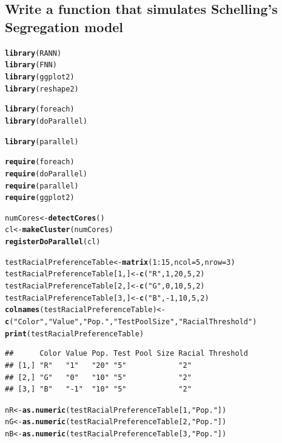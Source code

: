 \documentclass{article}\usepackage[]{graphicx}\usepackage[]{color}
\makeatletter
\newcommand{\hlnum}[1]{\textcolor[rgb]{0.686,0.059,0.569}{#1}}%
\newcommand{\hlstr}[1]{\textcolor[rgb]{0.192,0.494,0.8}{#1}}%
\newcommand{\hlopt}[1]{\textcolor[rgb]{0,0,0}{#1}}%
\newcommand{\hlstd}[1]{\textcolor[rgb]{0.345,0.345,0.345}{#1}}%
\newcommand{\hlkwb}[1]{\textcolor[rgb]{0.69,0.353,0.396}{#1}}%
\newcommand{\hlkwc}[1]{\textcolor[rgb]{0.333,0.667,0.333}{#1}}%
\newcommand{\hlkwd}[1]{\textcolor[rgb]{0.737,0.353,0.396}{\textbf{#1}}}%
\newenvironment{kframe}{%
 \def\at@end@of@kframe{}%
 \ifinner\ifhmode%
  \def\at@end@of@kframe{\end{minipage}}%
  \begin{minipage}{\columnwidth}%
 \fi\fi%
 \def\FrameCommand##1{\hskip\@totalleftmargin \hskip-\fboxsep
 \colorbox{shadecolor}{##1}\hskip-\fboxsep
     \hskip-\linewidth \hskip-\@totalleftmargin \hskip\columnwidth}%
 \MakeFramed {\advance\hsize-\width
   \@totalleftmargin\z@ \linewidth\hsize
   \@setminipage}}%
 {\par\unskip\endMakeFramed%
 \at@end@of@kframe}
\newenvironment{knitrout}{}{} %
\makeatother
\begin{document}
\subsection{Write a function that simulates Schelling's Segregation model}
\begin{knitrout}
\color{fgcolor}\begin{kframe}
\begin{alltt}
\hlkwd{library}\hlstd{(RANN)}
\hlkwd{library}\hlstd{(FNN)}
\hlkwd{library}\hlstd{(ggplot2)}
\hlkwd{library}\hlstd{(reshape2)}

\hlkwd{library}\hlstd{(foreach)}
\hlkwd{library}\hlstd{(doParallel)}
\end{alltt}


{\ttfamily\noindent\itshape\color{messagecolor}{\#\# Loading required package: iterators\\\#\# Loading required package: parallel}}\begin{alltt}
\hlkwd{library}\hlstd{(parallel)}

\hlkwd{require}\hlstd{(foreach)}
\hlkwd{require}\hlstd{(doParallel)}
\hlkwd{require}\hlstd{(parallel)}
\hlkwd{require}\hlstd{(ggplot2)}

\hlstd{numCores} \hlkwb{<-} \hlkwd{detectCores}\hlstd{()}
\hlstd{cl} \hlkwb{<-} \hlkwd{makeCluster}\hlstd{(numCores)}
\hlkwd{registerDoParallel}\hlstd{(cl)}

\hlstd{testRacialPreferenceTable} \hlkwb{<-} \hlkwd{matrix}\hlstd{(}\hlnum{1}\hlopt{:}\hlnum{15}\hlstd{,} \hlkwc{ncol} \hlstd{=} \hlnum{5}\hlstd{,} \hlkwc{nrow} \hlstd{=} \hlnum{3}\hlstd{)}
\hlstd{testRacialPreferenceTable[}\hlnum{1}\hlstd{,]} \hlkwb{<-} \hlkwd{c}\hlstd{(}\hlstr{"R"}\hlstd{,}\hlnum{1}\hlstd{,} \hlnum{20}\hlstd{,} \hlnum{5}\hlstd{,} \hlnum{2}\hlstd{)}
\hlstd{testRacialPreferenceTable[}\hlnum{2}\hlstd{,]} \hlkwb{<-} \hlkwd{c}\hlstd{(}\hlstr{"G"}\hlstd{,} \hlnum{0}\hlstd{,} \hlnum{10}\hlstd{,} \hlnum{5}\hlstd{,} \hlnum{2}\hlstd{)}
\hlstd{testRacialPreferenceTable[}\hlnum{3}\hlstd{,]} \hlkwb{<-} \hlkwd{c}\hlstd{(}\hlstr{"B"}\hlstd{,} \hlopt{-}\hlnum{1}\hlstd{,} \hlnum{10}\hlstd{,} \hlnum{5}\hlstd{,} \hlnum{2}\hlstd{)}
\hlkwd{colnames}\hlstd{(testRacialPreferenceTable)} \hlkwb{<-} \hlkwd{c}\hlstd{(}\hlstr{"Color"}\hlstd{,} \hlstr{"Value"}\hlstd{,} \hlstr{"Pop."}\hlstd{,} \hlstr{"Test Pool Size"}\hlstd{,} \hlstr{"Racial Threshold"}\hlstd{)}
\hlkwd{print}\hlstd{(testRacialPreferenceTable)}
\end{alltt}
\begin{verbatim}
##      Color Value Pop. Test Pool Size Racial Threshold
## [1,] "R"   "1"   "20" "5"            "2"             
## [2,] "G"   "0"   "10" "5"            "2"             
## [3,] "B"   "-1"  "10" "5"            "2"
\end{verbatim}
\begin{alltt}
\hlstd{nR} \hlkwb{<-} \hlkwd{as.numeric}\hlstd{(testRacialPreferenceTable[}\hlnum{1}\hlstd{,}\hlstr{"Pop."}\hlstd{])}
\hlstd{nG} \hlkwb{<-} \hlkwd{as.numeric}\hlstd{(testRacialPreferenceTable[}\hlnum{2}\hlstd{,}\hlstr{"Pop."}\hlstd{])}
\hlstd{nB} \hlkwb{<-} \hlkwd{as.numeric}\hlstd{(testRacialPreferenceTable[}\hlnum{3}\hlstd{,}\hlstr{"Pop."}\hlstd{])}


\end{alltt}
\end{kframe}
\end{knitrout}
\end{document}
